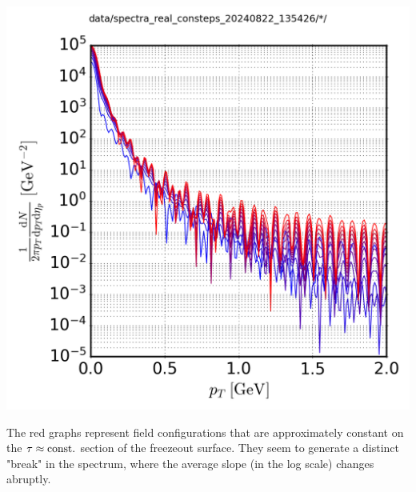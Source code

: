 {\begin{minipage}{\linewidth}
{\begin{minipage}{0.45\linewidth}
                \includegraphics[width=\linewidth]{code/C++/DCCspec/data/images/spectra_real_consteps_20240822_135426_spec.png}        
            \end{minipage}
        }
    \end{minipage}
}
The red graphs represent field configurations that are approximately constant on the $\tau\approx{\text{const.}}$ section of the freezeout surface. They seem to generate a distinct "break" in the spectrum, where the average slope (in the log scale) changes abruptly.

